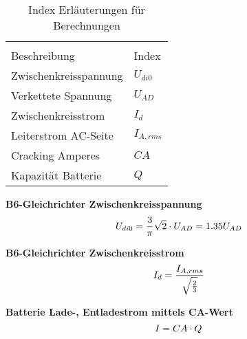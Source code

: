 \begin{table}[H]
	\centering
	\begin{tabular}{C{5cm} C{2.5cm}}
		\\
		{Beschreibung} & {Index} \\ \hline
		Zwischenkreisspannung    &   $  U_{di0} $   \\
		Verkettete Spannung    &   $ U_{AD} $   \\
		Zwischenkreisstrom    &   $ I_{d} $  \\
		Leiterstrom AC-Seite    &  $ I_{A,rms} $   \\
		Cracking Amperes    &  $ CA $  \\
		Kapazität Batterie    &  $ Q $   \\
	\end{tabular}
	\caption{Index Erläuterungen für Berechnungen}
	\label{tab:Begriffserklaerung}
\end{table}



\textbf{B6-Gleichrichter Zwischenkreisspannung}
\begin{equation}
	\centering
	U_{di0}=\frac{3}{\pi}\sqrt{2}\cdot U_{AD}=1.35U_{AD}
	\label{eq:B6-Ud}
\end{equation}

\textbf{B6-Gleichrichter Zwischenkreisstrom}
\begin{equation}
	\centering
	I_{d}=\frac{I_{A,rms}}{\sqrt{\frac{2}{3}}}
	\label{eq:B6-Id}
\end{equation}

\textbf{Batterie Lade-, Entladestrom mittels CA-Wert}
\begin{equation}
	\centering
	I=CA \cdot Q
	\label{eq:CA}
\end{equation}